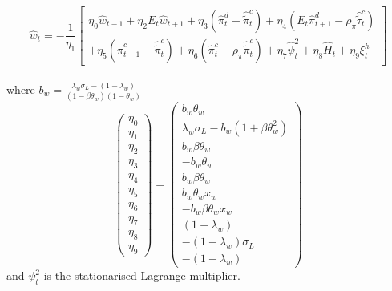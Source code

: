 \documentclass[9pt]{beamer}
\begin{document}
\begin{frame}[noframenumbering]
\begin{itemize}
\begin{itemize}
    $$
    \hat{w}_{t}=-\frac{1}{\eta_{1}}\left[\begin{array}{l}
    \eta_{0} \hat{w}_{t-1}+\eta_{2} E_{t} \hat{w}_{t+1}+\eta_{3}\left(\hat{\pi}_{t}^{d}-\hat{\tilde{\pi}}_{t}^{c}\right)+\eta_{4}\left(E_{t} \hat{\pi}_{t+1}^{d}-\rho_{\pi} \hat{\tilde{\tau}}_{t}^{c}\right) \\
    +\eta_{5}\left(\hat{\pi}_{t-1}^{c}-\hat{\tilde{\pi}}_{t}^{c}\right)+\eta_{6}\left(\hat{\pi}_{t}^{c}-\rho_{\pi} \hat{\tilde{\pi}}_{t}^{c}\right)+\eta_{7} \hat{\psi}_{t}^{2}+\eta_{8} \hat{H}_{t}+\eta_{9} \xi_{t}^{h}
    \end{array}\right]
    $$
\\
where $b_{w}=\frac{\lambda_{w} \sigma_{L}-\left(1-\lambda_{w}\right)}{\left(1-\beta \theta_{w}\right)\left(1-\theta_{w}\right)}$
$$
\left(\begin{array}{c}
\eta_{0} \\
\eta_{1} \\
\eta_{2} \\
\eta_{3} \\
\eta_{4} \\
\eta_{5} \\
\eta_{6} \\
\eta_{7} \\
\eta_{8} \\
\eta_{9}
\end{array}\right)=\left(\begin{array}{c}
b_{w} \theta_{w} \\
\lambda_{w} \sigma_{L}-b_{w}\left(1+\beta \theta_{w}^{2} \right) \\
b_{w} \beta \theta_{w} \\
-b_{w} \theta_{w} \\
b_{w} \beta \theta_{w} \\
b_{w} \theta_{w} x_{w} \\
-b_{w} \beta \theta_{w} x_{w} \\
\left(1-\lambda_{w}\right) \\
-\left(1-\lambda_{w}\right) \sigma_{L} \\
-\left(1-\lambda_{w}\right)
\end{array}\right)
$$
and $\psi_{t}^{2}$ is the stationarised Lagrange multiplier.

    
    \end{itemize}
    
    
\end{itemize}


\end{frame}
\end{document}
